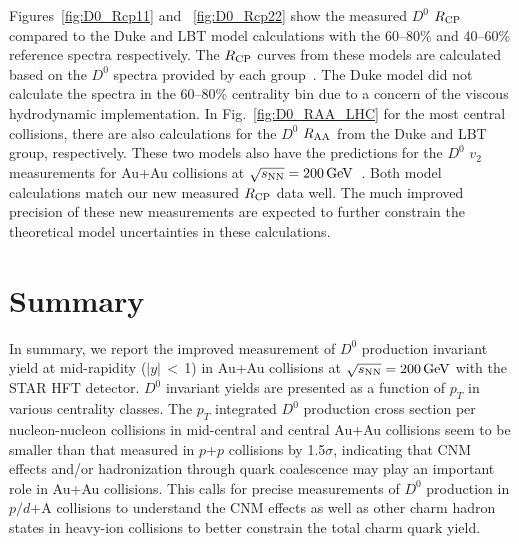 \documentclass[%
 reprint,	
 amsmath,amssymb,
 aps,
 prc,
]{revtex4-1}
\begin{document}
Figures~\ref{fig:D0_Rcp11} and ~\ref{fig:D0_Rcp22} show the measured $D^0$ $R_{\rm CP}$ compared to the Duke and LBT model calculations with the 60--80\% and 40--60\% reference spectra respectively. The $R_{\rm CP}$ curves from these models are calculated based on the $D^0$ spectra provided by each group~\cite{Cao:2016gvr,LBT:private,Xu:2017obm}. The Duke model did not calculate the spectra in the 60--80\% centrality bin due to a concern of the viscous hydrodynamic implementation. In Fig.~\ref{fig:D0_RAA_LHC} for the most central collisions, there are also calculations for the $D^0$ $R_{\rm AA}$ from the Duke and LBT group, respectively. These two models also have the predictions for the $D^0$ $v_2$ measurements for Au+Au collisions at ${\sqrt{s_{\rm NN}} = \rm{200\,GeV}}$~\cite{Star_D_v2}. %
Both model calculations match our new measured $R_{\rm CP}$ data well. The much improved precision of these new measurements are expected to further constrain the theoretical model uncertainties in these calculations.


\section{Summary}
\label{summary}

In summary, we report the improved measurement of $D^0$ production invariant yield at mid-rapidity ($|y|$\,$<$\,1) in Au+Au collisions at ${\sqrt{s_{\rm NN}} = \rm{200\,GeV}}$ with the STAR HFT detector. $D^0$ invariant yields are presented as a function of $p_{T}$ in various centrality classes. The $p_{T}$ integrated $D^0$ production cross section per nucleon-nucleon collisions in mid-central and central Au+Au collisions seem to be smaller than that measured in $p$+$p$ collisions by 1.5$\sigma$, indicating that CNM effects and/or hadronization through quark coalescence may play an important role in Au+Au collisions. This calls for precise measurements of $D^0$ production in $p/d$+A collisions to understand the CNM effects as well as other charm hadron states in heavy-ion collisions to better constrain the total charm quark yield. 
\end{document}
